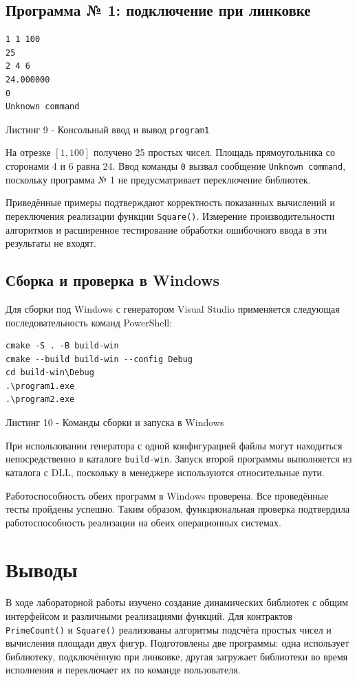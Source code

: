 \documentclass[12pt,a4paper]{article}
\begin{document}
\subsection{Программа № 1: подключение при линковке}
\begin{lstlisting}[language={},numbers=none]
1 1 100
25
2 4 6
24.000000
0
Unknown command
\end{lstlisting}
\begin{center}\small Листинг 9 - Консольный ввод и вывод \texttt{program1}\end{center}

На отрезке $[1,100]$ получено 25 простых чисел. Площадь прямоугольника со сторонами 4 и 6 равна 24. Ввод команды \texttt{0} вызвал сообщение \texttt{Unknown command}, поскольку программа № 1 не предусматривает переключение библиотек.

Приведённые примеры подтверждают корректность показанных вычислений и переключения реализации функции \texttt{Square()}. Измерение производительности алгоритмов и расширенное тестирование обработки ошибочного ввода в эти результаты не входят.

\subsection{Сборка и проверка в Windows}
Для сборки под Windows с генератором Visual Studio применяется следующая последовательность команд PowerShell:
\begin{lstlisting}[language={}]
cmake -S . -B build-win
cmake --build build-win --config Debug
cd build-win\Debug
.\program1.exe
.\program2.exe
\end{lstlisting}
\begin{center}\small Листинг 10 - Команды сборки и запуска в Windows\end{center}

При использовании генератора с одной конфигурацией файлы могут находиться непосредственно в каталоге \texttt{build-win}. Запуск второй программы выполняется из каталога с DLL, поскольку в менеджере используются относительные пути.

Работоспособность обеих программ в Windows проверена. Все проведённые тесты пройдены успешно. Таким образом, функциональная проверка подтвердила работоспособность реализации на обеих операционных системах.

\section{Выводы}
В ходе лабораторной работы изучено создание динамических библиотек с общим интерфейсом и различными реализациями функций. Для контрактов \texttt{PrimeCount()} и \texttt{Square()} реализованы алгоритмы подсчёта простых чисел и вычисления площади двух фигур. Подготовлены две программы: одна использует библиотеку, подключённую при линковке, другая загружает библиотеки во время исполнения и переключает их по команде пользователя.
\end{document}

